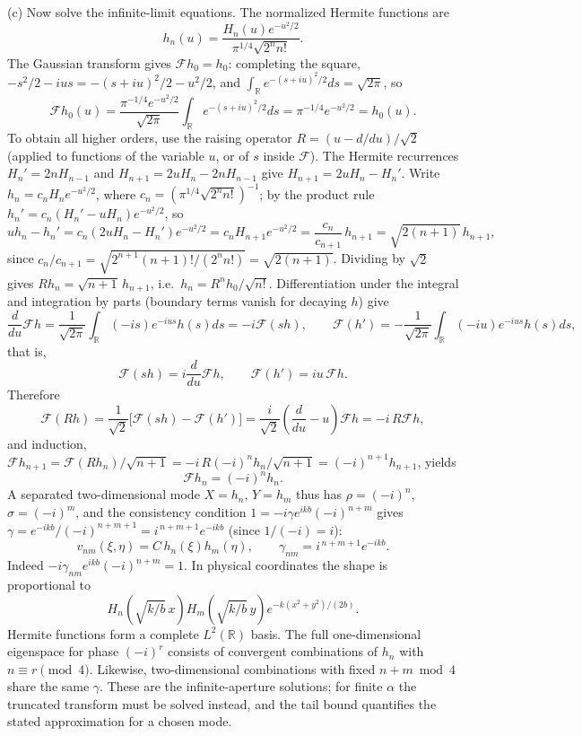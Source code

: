 (c) Now solve the infinite-limit equations. The normalized
Hermite functions are
\[
h_n(u)=\frac{H_n(u)e^{-u^2/2}}
{\pi^{1/4}\sqrt{2^nn!}}.
\]
The Gaussian transform gives $\mathcal Fh_0=h_0$: completing the
square, $-s^2/2-ius=-(s+iu)^2/2-u^2/2$, and
$\int_{\mathbb R}e^{-(s+iu)^2/2}ds=\sqrt{2\pi}$, so
\[
\mathcal Fh_0(u)=\frac{\pi^{-1/4}e^{-u^2/2}}{\sqrt{2\pi}}
\int_{\mathbb R}e^{-(s+iu)^2/2}ds=\pi^{-1/4}e^{-u^2/2}=h_0(u).
\]
To obtain all higher orders, use the raising operator $R=(u-d/du)/\sqrt2$
(applied to functions of the variable $u$, or of $s$ inside $\mathcal F$). The
Hermite recurrences $H_n'=2nH_{n-1}$ and $H_{n+1}=2uH_n-2nH_{n-1}$ give
$H_{n+1}=2uH_n-H_n'$. Write $h_n=c_nH_ne^{-u^2/2}$, where
$c_n=(\pi^{1/4}\sqrt{2^nn!})^{-1}$; by the product rule
$h_n'=c_n(H_n'-uH_n)e^{-u^2/2}$, so
\[
uh_n-h_n'=c_n(2uH_n-H_n')e^{-u^2/2}=c_nH_{n+1}e^{-u^2/2}
=\frac{c_n}{c_{n+1}}\,h_{n+1}=\sqrt{2(n+1)}\,h_{n+1},
\]
since $c_n/c_{n+1}=\sqrt{2^{n+1}(n+1)!/(2^nn!)}=\sqrt{2(n+1)}$.
Dividing by $\sqrt2$ gives $R h_n=\sqrt{n+1}\,h_{n+1}$, i.e.\
$h_n=R^nh_0/\sqrt{n!}$. Differentiation under the integral
and integration by parts (boundary terms vanish for decaying $h$) give
\[
\frac{d}{du}\mathcal Fh=\frac1{\sqrt{2\pi}}\int_{\mathbb R}(-is)e^{-ius}h(s)ds
=-i\mathcal F(sh),\qquad
\mathcal F(h')=-\frac1{\sqrt{2\pi}}\int_{\mathbb R}(-iu)e^{-ius}h(s)ds,
\]
that is,
\[
\mathcal F(sh)=i\frac{d}{du}\mathcal Fh,\qquad
\mathcal F(h')=iu\,\mathcal Fh.
\]
Therefore
\[
\mathcal F(R h)
=\frac1{\sqrt2}\bigl[\mathcal F(sh)-\mathcal F(h')\bigr]
=\frac{i}{\sqrt2}\left(\frac{d}{du}-u\right)\mathcal Fh
=-i\,R\mathcal Fh,
\]
and induction,
$\mathcal Fh_{n+1}=\mathcal F(R h_n)/\sqrt{n+1}
=-i\,R(-i)^nh_n/\sqrt{n+1}=(-i)^{n+1}h_{n+1}$, yields
\[
\boxed{\mathcal Fh_n=(-i)^nh_n}.
\]
A separated two-dimensional mode $X=h_n$, $Y=h_m$ thus has
$\rho=(-i)^n$, $\sigma=(-i)^m$, and the consistency condition
$1=-i\gamma e^{ikb}(-i)^{n+m}$ gives
$\gamma=e^{-ikb}/(-i)^{n+m+1}=i^{\,n+m+1}e^{-ikb}$ (since $1/(-i)=i$):
\[
\boxed{v_{nm}(\xi,\eta)=C\,h_n(\xi)h_m(\eta),\qquad
\gamma_{nm}=i^{\,n+m+1}e^{-ikb}}.
\]
Indeed $-i\gamma_{nm}e^{ikb}(-i)^{n+m}=1$.
In physical coordinates the shape is proportional to
\[
H_n\!\left(\sqrt{k/b}\,x\right)
H_m\!\left(\sqrt{k/b}\,y\right)
e^{-k(x^2+y^2)/(2b)}.
\]
Hermite functions form a complete $L^2(\mathbb R)$ basis.
The full one-dimensional eigenspace for phase $(-i)^r$ consists of
convergent combinations of $h_n$ with $n\equiv r\pmod4$.
Likewise, two-dimensional combinations with fixed $n+m\bmod4$
share the same $\gamma$. These are the infinite-aperture solutions;
for finite $\alpha$ the truncated transform must be solved instead,
and the tail bound quantifies the stated approximation for a chosen mode.



